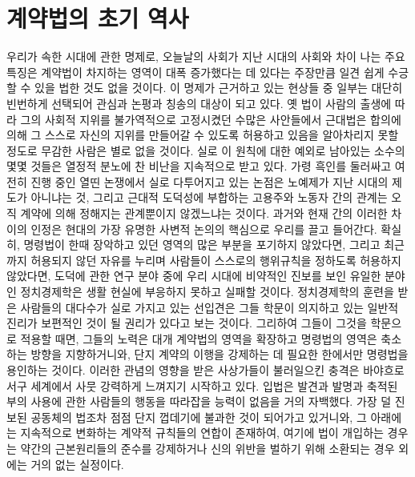 \chapter{계약법의 초기 역사}

우리가 속한 시대에 관한 명제로,
오늘날의 사회가
지난 시대의 사회와 차이 나는 주요 특징은
계약법이 차지하는 영역이 대폭 증가했다는 데 있다는
주장만큼
일견 쉽게 수긍할 수 있을 법한 것도 없을 것이다.
이 명제가 근거하고 있는 현상들 중 일부는
대단히 빈번하게 선택되어 관심과 논평과 칭송의 대상이 되고 있다.
옛 법이 사람의 출생에 따라 그의 사회적 지위를
불가역적으로 고정시켰던 수많은 사안들에서
근대법은 합의에 의해 그 스스로 자신의 지위를 만들어갈 수 있도록
허용하고 있음을
알아차리지 못할 정도로
무감한 사람은
별로 없을 것이다.
실로 이 원칙에 대한 예외로 남아있는 소수의 몇몇 것들은
열정적 분노에 찬 비난을 지속적으로 받고 있다.
가령 흑인를 둘러싸고 여전히 진행 중인 열띤 논쟁에서
실로 다투어지고 있는 논점은
노예제가 지난 시대의 제도가 아니냐는 것,
그리고
근대적 도덕성에 부합하는
고용주와 노동자 간의 관계는
오직 계약에 의해 정해지는 관계뿐이지 않겠느냐는 것이다.
과거와 현재 간의 이러한 차이의 인정은
현대의 가장 유명한 사변적 논의의 핵심으로 우리를 끌고 들어간다.
확실히,
명령법이
한때 장악하고 있던 영역의 많은 부분을
포기하지 않았다면,
그리고
최근까지 허용되지 않던 자유를 누리며
사람들이 스스로의 행위규칙을 정하도록 허용하지 않았다면,
도덕에 관한 연구 분야 중에
우리 시대에 비약적인 진보를 보인 유일한 분야인
정치경제학은
생활 현실에 부응하지 못하고 실패할 것이다.
정치경제학의 훈련을 받은 사람들의 대다수가
실로 가지고 있는 선입견은
그들 학문이 의지하고 있는 일반적 진리가
보편적인 것이 될 권리가 있다고 보는 것이다.
그리하여 그들이 그것을 학문으로 적용할 때면,
그들의 노력은 대개 계약법의 영역을 확장하고
명령법의 영역은 축소하는 방향을 지향하거니와,
단지 계약의 이행을 강제하는 데 필요한 한에서만
명령법을 용인하는 것이다.
이러한 관념의 영향을 받은 사상가들이 불러일으킨 충격은
바야흐로 서구 세계에서 사뭇 강력하게 느껴지기 시작하고 있다.
입법은
발견과 발명과 축적된 부의 사용에 관한 사람들의 행동을
따라잡을 능력이 없음을
거의 자백했다.
가장 덜 진보된 공동체의 법조차
점점 단지 껍데기에 불과한 것이 되어가고 있거니와,
그 아래에는
지속적으로 변화하는 계약적 규칙들의 연합이 존재하여,
여기에 법이 개입하는 경우는
약간의 근본원리들의 준수를 강제하거나
신의 위반을 벌하기 위해 소환되는 경우 외에는
거의 없는 실정이다.

